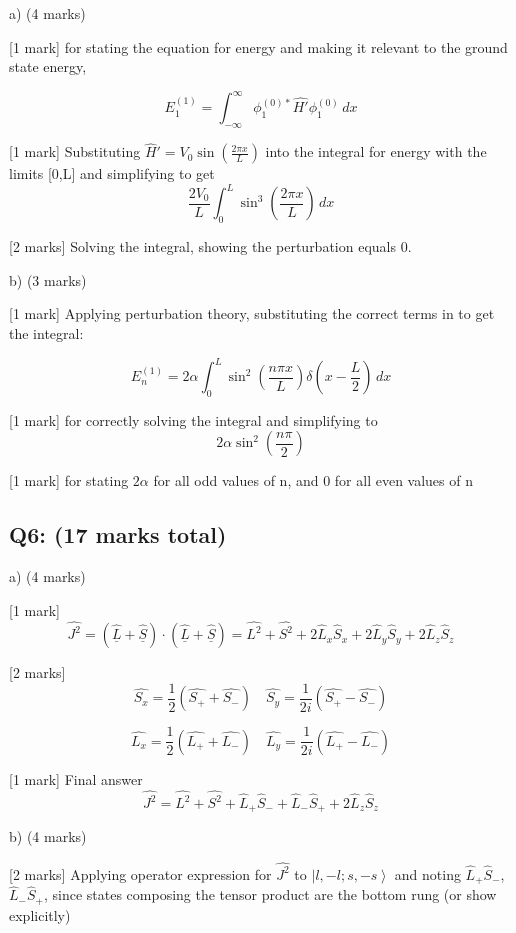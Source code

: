 \documentclass[a4paper,11pt]{article}
\begin{document}
a) (4 marks)

[1 mark] for stating the equation for energy and making it relevant to the ground state energy, 

\[ E_{1}^{(1)} = \int_{-\infty}^{\infty} \phi_{1}^{(0)*}\hat{H'}\phi_{1}^{(0)} \, dx \]

[1 mark] Substituting \( \hat{H}' = V_{0} \sin\left(\frac{2 \pi x}{L} \right) \) into the integral for energy with the limits [0,L] and simplifying to get \[ \frac{2V_{0}}{L} \int_{0}^{L} \sin^{3}\left(\frac{2 \pi x}{L} \right) \, dx \]

[2 marks] Solving the integral, showing the perturbation equals 0.

b) (3 marks)

[1 mark] Applying perturbation theory, substituting the correct terms in to get the integral: 

\[ E_{n}^{(1)} = 2 \alpha \int_{0}^{L} \sin^{2}\left(\frac{n \pi x}{L} \right) \delta\left(x - \frac{L}{2} \right) \, dx \]

[1 mark] for correctly solving the integral and simplifying to 
\[ 2 \alpha \sin^{2}\left(\frac{n \pi}{2} \right) \]

[1 mark] for stating \(2 \alpha \) for all odd values of n, and 0 for all even values of n 

\subsection*{Q6: (17 marks total) }

a) (4 marks)

[1 mark] \[ \hat{J^{2}} = \left(\hat{\underline{L}} + \hat{\underline{S}} \right) \cdot \left(\hat{\underline{L}} + \hat{\underline{S}} \right) =  \hat{L^{2}} + \hat{S^{2}} + 2\hat{L}_{x}\hat{S}_{x} + 2\hat{L}_{y}\hat{S}_{y} + 2\hat{L}_{z}\hat{S}_{z} \]

[2 marks]  \[ \hat{S_{x}} = \frac{1}{2} (\hat{S_{+}} + \hat{S_{-}}) \quad \hat{S_{y}} = \frac{1}{2i} (\hat{S_{+}} - \hat{S_{-}}) \] 

\[ \hat{L_{x}} = \frac{1}{2} (\hat{L_{+}} + \hat{L_{-}}) \quad \hat{L_{y}} = \frac{1}{2i} (\hat{L_{+}} - \hat{L_{-}}) \]

[1 mark] Final answer \[ \hat{J^{2}} =  \hat{L^{2}} + \hat{S^{2}} + \hat{L}_{+}\hat{S}_{-} +  \hat{L}_{-}\hat{S}_{+} + 2\hat{L}_{z}\hat{S}_{z} \]

b) (4 marks)

[2 marks] Applying operator expression for \( \hat{J^{2}} \) to \( \left|l, -l; s, -s \right> \) and noting \( \hat{L}_{+}\hat{S}_{-} \), \( \hat{L}_{-}\hat{S}_{+} \), since states composing the tensor product are the bottom rung (or show explicitly)
\end{document}
